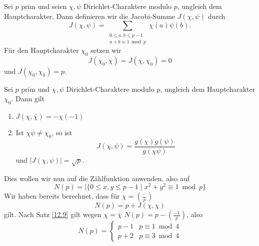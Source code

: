 \begin{defn*}
	Sei $p$ prim und seien $\chi,\psi$ Dirichlet-Charaktere modulo $p$, ungleich dem Hauptcharakter. Dann definieren wir die Jacobi-Summe $J(\chi,\psi)$ durch
	\[ J(\chi,\psi) = \sum_{\substack{0 \leq a, b \leq p-1\\a + b \equiv 1 \bmod p}} \chi(a) \psi(b). \]
	Für den Hauptcharakter $\chi_0$ setzen wir
	\[ J(\chi_0,\chi) = J(\chi,\chi_0) = 0 \]
	und $J(\chi_0,\chi_0) = p$.
\end{defn*}

\begin{thm}\autolabel
	Sei $p$ prim und $\chi,\psi$ Dirichlet-Charaktere modulo $p$, ungleich dem Hauptcharakter $\chi_0$. Dann gilt
	\begin{enumerate}[label={\roman*})]
		\item $J(\chi,\bar{\chi}) = -\chi(-1)$
		\item Ist $\chi\psi \neq \chi_0$, so ist
			\[ J(\chi,\psi) = \frac{g(\chi)g(\psi)}{g(\chi\psi)} \]
			und $|J(\chi,\psi)| = \sqrt{p}$.
	\end{enumerate}
\end{thm}

Dies wollen wir nun auf die Zählfunktion anwenden, also auf
\[ N(p) = |\{0 \leq x,y \leq p-1 \mid x^2+y^2 \equiv 1 \bmod p\} \]
Wir haben bereits berechnet, dass für $\chi = \left(\frac{\cdot}{p}\right)$
\[ N(p) = p + J(\chi,\chi) \]
gilt. Nach Satz \ref{12.9} gilt wegen $\chi = \bar{\chi}$ $N(p) = p-\left(\frac{-1}{p}\right)$, also
\[ N(p) = \begin{cases}
	p-1 &p \equiv 1 \bmod 4\\
	p+2 &p \equiv 3 \bmod 4
\end{cases} \]

